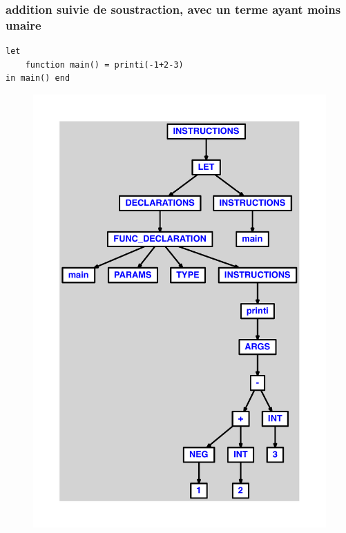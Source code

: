 \documentclass{article}
\begin{document}
\subsubsection{addition suivie de soustraction, avec un terme ayant moins unaire}
\begin{lstlisting}
let
	function main() = printi(-1+2-3)
in main() end
\end{lstlisting}
\newpage
\begin{figure}[H]
\centering
\includegraphics[max width=\textwidth]{ast/ast_68.pdf}
\end{figure}
\newpage
\end{document}
